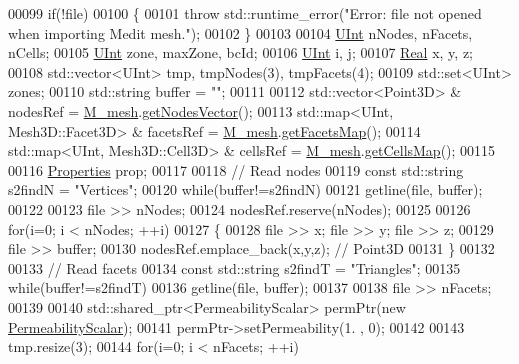 \begin{DoxyCode}
00099     \textcolor{keywordflow}{if}(!file)
00100     \{
00101         \textcolor{keywordflow}{throw} std::runtime\_error(\textcolor{stringliteral}{"Error: file not opened when importing Medit mesh."});
00102     \}
00103 
00104     \hyperlink{namespaceFVCode3D_a4bf7e328c75d0fd504050d040ebe9eda}{UInt} nNodes, nFacets, nCells;
00105     \hyperlink{namespaceFVCode3D_a4bf7e328c75d0fd504050d040ebe9eda}{UInt} zone, maxZone, bcId;
00106     \hyperlink{namespaceFVCode3D_a4bf7e328c75d0fd504050d040ebe9eda}{UInt} i, j;
00107     \hyperlink{namespaceFVCode3D_a40c1f5588a248569d80aa5f867080e83}{Real} x, y, z;
00108     std::vector<UInt> tmp, tmpNodes(3), tmpFacets(4);
00109     std::set<UInt> zones;
00110     std::string buffer = \textcolor{stringliteral}{""};
00111 
00112     std::vector<Point3D> & nodesRef = \hyperlink{classFVCode3D_1_1Importer_a6f1542d6c6ac192e36c8eec7dc366653}{M\_mesh}.\hyperlink{classFVCode3D_1_1Mesh3D_a04162ec60e0fe52674b3ecbb7de1185c}{getNodesVector}();
00113     std::map<UInt, Mesh3D::Facet3D> & facetsRef = \hyperlink{classFVCode3D_1_1Importer_a6f1542d6c6ac192e36c8eec7dc366653}{M\_mesh}.\hyperlink{classFVCode3D_1_1Mesh3D_a76de387da2a552e3e1210d795bc7acf9}{getFacetsMap}();
00114     std::map<UInt, Mesh3D::Cell3D> & cellsRef = \hyperlink{classFVCode3D_1_1Importer_a6f1542d6c6ac192e36c8eec7dc366653}{M\_mesh}.\hyperlink{classFVCode3D_1_1Mesh3D_ad904ef5e068c89951d77e9364e960bf3}{getCellsMap}();
00115 
00116     \hyperlink{classFVCode3D_1_1Properties}{Properties} prop;
00117 
00118     \textcolor{comment}{// Read nodes}
00119     \textcolor{keyword}{const} std::string s2findN = \textcolor{stringliteral}{"Vertices"};
00120     \textcolor{keywordflow}{while}(buffer!=s2findN)
00121         getline(file, buffer);
00122 
00123     file >> nNodes;
00124     nodesRef.reserve(nNodes);
00125 
00126     \textcolor{keywordflow}{for}(i=0; i < nNodes; ++i)
00127     \{
00128         file >> x; file >> y; file >> z;
00129         file >> buffer;
00130         nodesRef.emplace\_back(x,y,z); \textcolor{comment}{// Point3D}
00131     \}
00132 
00133     \textcolor{comment}{// Read facets}
00134     \textcolor{keyword}{const} std::string s2findT = \textcolor{stringliteral}{"Triangles"};
00135     \textcolor{keywordflow}{while}(buffer!=s2findT)
00136         getline(file, buffer);
00137 
00138     file >> nFacets;
00139 
00140     std::shared\_ptr<PermeabilityScalar> permPtr(\textcolor{keyword}{new} \hyperlink{classFVCode3D_1_1PermeabilityScalar}{PermeabilityScalar});
00141     permPtr->setPermeability(1. , 0);
00142 
00143     tmp.resize(3);
00144     \textcolor{keywordflow}{for}(i=0; i < nFacets; ++i)

\end{DoxyCode}
